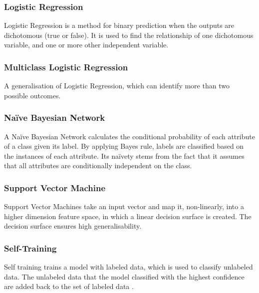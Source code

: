 \documentclass[a4paper,titlepage]{article}
\begin{document}
\subsubsection*{Logistic Regression}
Logistic Regression is a method for binary prediction when the outputs are dichotomous (true or false). 
It is used to find the relationship of one dichotomous variable, and one or more other independent variable. \cite{logisticregression}
\subsubsection*{Multiclass Logistic Regression}
A generalisation of Logistic Regression, which can identify more than two possible outcomes. \cite{greene2012}
\subsubsection*{Naïve Bayesian Network}
A Naïve Bayesian Network calculates the conditional probability of each attribute of a class given its label.
By applying Bayes rule, labels are classified based on the instances of each attribute.
Its naïvety stems from the fact that it assumes that all attributes are conditionally independent on the class. \cite{friedman1997bayesian}
\subsubsection*{Support Vector Machine}
Support Vector Machines take an input vector and map it, non-linearly, into a higher dimension feature space, in which a linear decision surface is created.
The decision surface ensures high generalisability. \cite{cortes1995support}
\subsubsection*{Self-Training}
Self training trains a model with labeled data, which is used to classify unlabeled data.
The unlabeled data that the model classified with the highest confidence are added back to the set of labeled data \cite{fazakis2016}.
\end{document}
